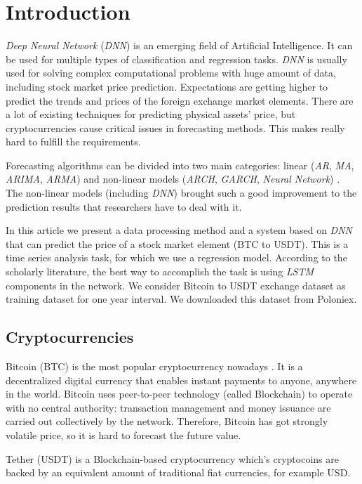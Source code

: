 \documentclass[conference]{IEEEtran}
\begin{document}
\section{Introduction}

\emph{Deep Neural Network} (\emph{DNN}) is an emerging field of Artificial Intelligence. It can be used for multiple types of classification and regression tasks. \emph{DNN} is usually used for solving complex computational problems with huge amount of data, including stock market price prediction. Expectations are getting higher to predict the trends and prices of the foreign exchange market elements. There are a lot of existing techniques for predicting physical assets' price, but cryptocurrencies cause critical issues in forecasting methods. This makes really hard to fulfill the requirements.

Forecasting algorithms can be divided into two main categories: linear (\emph{AR}, \emph{MA}, \emph{ARIMA}, \emph{ARMA}) and non-linear models (\emph{ARCH}, \emph{GARCH}, \emph{Neural Network}) \cite{b6} \cite{b7}. The non-linear models (including \emph{DNN}) brought such a good improvement to the prediction results that researchers have to deal with it.

In this article we present a data processing method and a system based on \emph{DNN} that can predict the price of a stock market element (BTC to USDT). This is a time series analysis task, for which we use a regression model. According to the scholarly literature, the best way to accomplish the task is using \emph{LSTM} components in the network. We consider Bitcoin to USDT exchange dataset as training dataset for one year interval. We downloaded this dataset from Poloniex.

\subsection{Cryptocurrencies}

Bitcoin (BTC) is the most popular cryptocurrency nowadays \cite{bitcoin}. It is a decentralized digital currency that enables instant payments to anyone, anywhere in the world. Bitcoin uses peer-to-peer technology (called Blockchain) to operate with no central authority: transaction management and money issuance are carried out collectively by the network. Therefore, Bitcoin has got strongly volatile price, so it is hard to forecast the future value.

Tether (USDT) is a Blockchain-based cryptocurrency which's cryptocoins are backed by an equivalent amount of traditional fiat currencies, for example USD.
\end{document}
